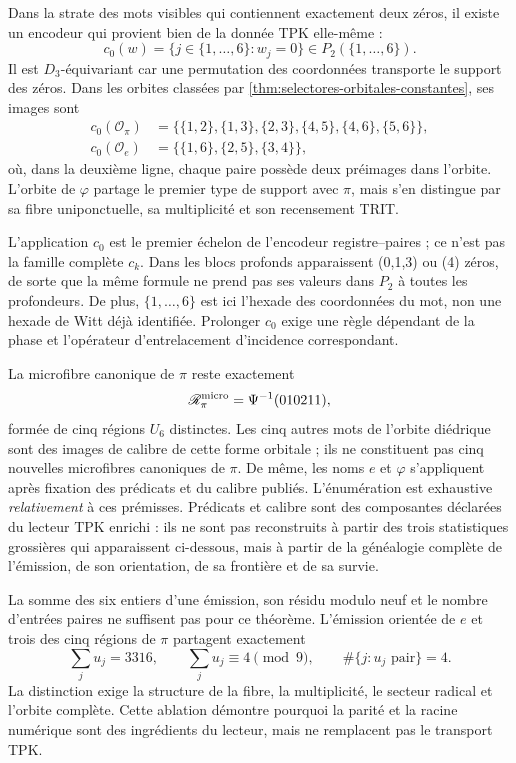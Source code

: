 Dans la strate des mots visibles qui contiennent exactement deux zéros, il existe
un encodeur qui provient bien de la donnée TPK elle-même :
\[
 c_0(w)=\{j\in\{1,\ldots,6\}:w_j=0\}
 \in P_2(\{1,\ldots,6\}).
\]
Il est \(D_3\)-équivariant car une permutation des coordonnées transporte le
support des zéros. Dans les orbites classées par
\cref{thm:selectores-orbitales-constantes}, ses images sont
\[
\begin{aligned}
 c_0(\mathcal O_\pi)
 &=\{\{1,2\},\{1,3\},\{2,3\},\{4,5\},\{4,6\},\{5,6\}\},\\
 c_0(\mathcal O_e)
 &=\{\{1,6\},\{2,5\},\{3,4\}\},
\end{aligned}
\]
où, dans la deuxième ligne, chaque paire possède deux préimages dans l'orbite.
L'orbite de \(\varphi\) partage le premier type de support avec \(\pi\), mais
s'en distingue par sa fibre uniponctuelle, sa multiplicité et son recensement TRIT\@.

L'application \(c_0\) est le premier échelon de l'encodeur registre--paires ; ce n'est pas la
famille complète \(c_k\). Dans les blocs profonds apparaissent (0,1,3) ou (4)
zéros, de sorte que la même formule ne prend pas ses valeurs dans \(P_2\) à toutes les
profondeurs. De plus, \(\{1,\ldots,6\}\) est ici l'hexade des coordonnées du
mot, non une hexade de Witt déjà identifiée. Prolonger \(c_0\) exige
une règle dépendant de la phase et l'opérateur d'entrelacement d'incidence correspondant.

La microfibre canonique de \(\pi\) reste exactement
\[
 \mathscr R_\pi^{\rm micro}=\Psi^{-1}(010211),
\]
formée de cinq régions \(U_6\) distinctes. Les cinq autres mots de
l'orbite diédrique sont des images de calibre de cette forme orbitale ; ils ne constituent pas
cinq nouvelles microfibres canoniques de \(\pi\). De même, les noms
\(e\) et \(\varphi\) s'appliquent après fixation des prédicats et du calibre
publiés. L'énumération est exhaustive \emph{relativement} à ces
prémisses. Prédicats et calibre sont des composantes déclarées du lecteur TPK
enrichi : ils ne sont pas reconstruits à partir des trois statistiques grossières
qui apparaissent ci-dessous, mais à partir de la généalogie complète de l'émission,
de son orientation, de sa frontière et de sa survie.

La somme des six entiers d'une émission, son résidu modulo neuf et le
nombre d'entrées paires ne suffisent pas pour ce théorème. L'émission orientée
de \(e\) et trois des cinq régions de \(\pi\) partagent exactement
\[
 \sum_j u_j=3316,
 \qquad
 \sum_j u_j\equiv4\pmod9,
 \qquad
 \#\{j:u_j\text{ pair}\}=4.
\]
La distinction exige la structure de la fibre, la multiplicité, le secteur
radical et l'orbite complète. Cette ablation démontre pourquoi la parité et
la racine numérique sont des ingrédients du lecteur, mais ne remplacent pas le
transport TPK\@.

